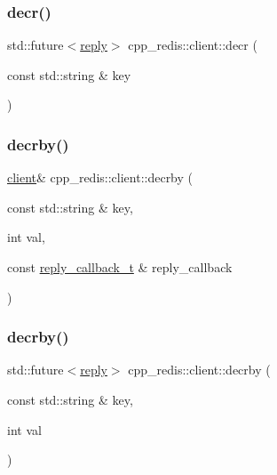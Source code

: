 \mbox{\label{classcpp__redis_1_1client_ac80abd9a238a7613294d4444bbc92907}} 
\subsubsection{\texorpdfstring{decr()}{decr()}\hspace{0.1cm}{\footnotesize\ttfamily [2/2]}}
{\footnotesize\ttfamily std\+::future$<$\hyperlink{classcpp__redis_1_1reply}{reply}$>$ cpp\+\_\+redis\+::client\+::decr (\begin{DoxyParamCaption}\item[{const std\+::string \&}]{key }\end{DoxyParamCaption})}

\mbox{\label{classcpp__redis_1_1client_aaa45a662abeaa66f5a8c985cd27957c8}} 
\subsubsection{\texorpdfstring{decrby()}{decrby()}\hspace{0.1cm}{\footnotesize\ttfamily [1/2]}}
{\footnotesize\ttfamily \hyperlink{classcpp__redis_1_1client}{client}\& cpp\+\_\+redis\+::client\+::decrby (\begin{DoxyParamCaption}\item[{const std\+::string \&}]{key,  }\item[{int}]{val,  }\item[{const \hyperlink{classcpp__redis_1_1client_a061a1140d36d2eaeda82b09a0bb3f9f2}{reply\+\_\+callback\+\_\+t} \&}]{reply\+\_\+callback }\end{DoxyParamCaption})}

\mbox{\label{classcpp__redis_1_1client_ac4fe81368d7f9cc305811d8346e60881}} 
\subsubsection{\texorpdfstring{decrby()}{decrby()}\hspace{0.1cm}{\footnotesize\ttfamily [2/2]}}
{\footnotesize\ttfamily std\+::future$<$\hyperlink{classcpp__redis_1_1reply}{reply}$>$ cpp\+\_\+redis\+::client\+::decrby (\begin{DoxyParamCaption}\item[{const std\+::string \&}]{key,  }\item[{int}]{val }\end{DoxyParamCaption})}

